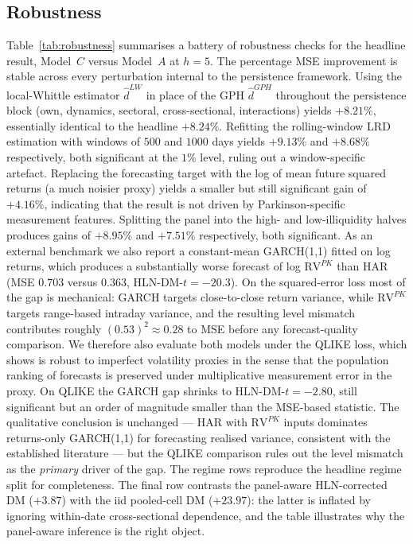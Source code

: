 \documentclass[11pt,a4paper]{article}
\newcommand{\RVPK}{\mathrm{RV}^{PK}}
\newcommand{\dhat}{\hat d}
\begin{document}
\subsection{Robustness}

Table~\ref{tab:robustness} summarises a battery of robustness checks
for the headline result, Model~$C$ versus Model~$A$ at $h=5$. The
percentage MSE improvement is stable across every perturbation
internal to the persistence framework. Using
the local-Whittle estimator $\dhat^{LW}$ in place of the GPH
$\dhat^{GPH}$ throughout the persistence block (own, dynamics,
sectoral, cross-sectional, interactions) yields $+8.21\%$, essentially
identical to the headline $+8.24\%$. Refitting the rolling-window LRD
estimation with windows of $500$ and $1000$ days yields $+9.13\%$ and
$+8.68\%$ respectively, both significant at the $1\%$ level, ruling
out a window-specific artefact. Replacing the forecasting target with
the log of mean future squared returns (a much noisier proxy) yields a
smaller but still significant gain of $+4.16\%$, indicating that the
result is not driven by Parkinson-specific measurement features.
Splitting the panel into the high- and low-illiquidity halves produces
gains of $+8.95\%$ and $+7.51\%$ respectively, both significant. As an
external benchmark we also report a constant-mean GARCH(1,1) fitted on
log returns, which produces a substantially worse forecast of log
$\RVPK$ than HAR (MSE $0.703$ versus $0.363$, HLN-DM-$t = -20.3$). On
the squared-error loss most of the gap is mechanical: GARCH targets
close-to-close return variance, while $\RVPK$ targets range-based
intraday variance, and the resulting level mismatch contributes
roughly $(0.53)^2 \approx 0.28$ to MSE before any forecast-quality
comparison. We therefore also evaluate both models under the QLIKE
loss, which \citet{patton2011volatility} shows is robust to
imperfect volatility proxies in the sense that the population
ranking of forecasts is preserved under multiplicative measurement
error in the proxy. On QLIKE the GARCH gap shrinks to
HLN-DM-$t = -2.80$, still significant but an order of magnitude
smaller than the MSE-based statistic. The qualitative conclusion is
unchanged --- HAR with $\RVPK$ inputs dominates returns-only
GARCH(1,1) for forecasting realised variance, consistent with the
established literature \citep{andersen2003modeling,corsi2009simple} ---
but the QLIKE comparison rules out the level mismatch as the
\emph{primary} driver of the gap. The
regime rows reproduce the headline regime split for completeness. The
final row contrasts the panel-aware HLN-corrected DM ($+3.87$) with
the iid pooled-cell DM ($+23.97$): the latter is inflated by ignoring
within-date cross-sectional dependence, and the table illustrates why
the panel-aware inference is the right object.
\end{document}
